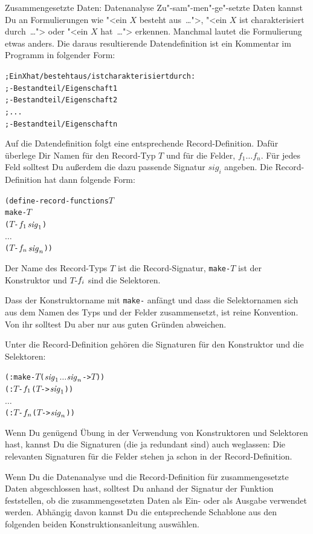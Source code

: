 \begin{konstruktionsanleitung}{Zusammengesetzte Daten: Datenanalyse}
  \label{ka:zusammengesetzt-datenanalyse}
Zu"-sam"-men"-ge"-setzte Daten kannst Du an Formulierungen wie "<ein $X$
besteht aus~\ldots">, "<ein $X$ ist charakterisiert durch~\ldots">
oder "<ein $X$ hat~\ldots"> erkennen.  Manchmal lautet die
Formulierung etwas anders.  Die daraus resultierende Datendefinition
ist ein Kommentar im Programm in folgender Form:
%
\begin{alltt}
; Ein X hat / besteht aus / ist charakterisiert durch:
; - Bestandteil / Eigenschaft 1
; - Bestandteil / Eigenschaft 2
; ...
; - Bestandteil / Eigenschaft n
\end{alltt}
%
Auf die Datendefinition folgt eine entsprechende Record-Definition.
Dafür überlege Dir Namen für den Record-Typ $T$ und für die
Felder, $f_1 \ldots f_n$.  Für jedes Feld solltest Du außerdem
die dazu passende Signatur $\mathit{sig}_{i}$ angeben.
Die Record-Definition hat dann folgende
Form:
%
\begin{alltt}
(define-record-functions \(T\)
  make-\(T\)
  (\(T\)-\(f\sb{1}\) \(\mathit{sig}\sb{1}\))
  \(\ldots\)
  (\(T\)-\(f\sb{n}\) \(\mathit{sig}\sb{n}\)))
\end{alltt}
%
Der Name des Record-Typs \(T\) ist die Record-Signatur,
\texttt{make-\(T\)} ist der Konstruktor und \(T\)-\(f\sb{i}\)
sind die Selektoren.

Dass der Konstruktorname mit \texttt{make-} anfängt und dass die
Selektornamen sich aus dem Namen des Typs und der Felder
zusammensetzt, ist reine Konvention.  Von ihr solltest Du aber nur aus
guten Gründen abweichen.

Unter die Record-Definition gehören die Signaturen für den Konstruktor
und die Selektoren:
%
\begin{alltt}
(: make-\(T\) (\(\mathit{sig}\sb{1}\) \(\ldots\) \(\mathit{sig}\sb{n}\) -> \(T\)))
(: \(T\)-\(f\sb{1}\) (\(T\) -> \(\mathit{sig}\sb{1}\)))
\(\ldots\)
(: \(T\)-\(f\sb{n}\) (\(T\) -> \(\mathit{sig}\sb{n}\)))
\end{alltt}
%
\end{konstruktionsanleitung}
%
Wenn Du genügend Übung in der Verwendung von Konstruktoren und
Selektoren hast, kannst Du die Signaturen (die ja redundant sind)
auch weglassen: Die relevanten Signaturen für die Felder stehen ja
schon in der Record-Definition.

Wenn Du die Datenanalyse und die Record-Definition für
zusammengesetzte Daten abgeschlossen hast, solltest Du anhand der
Signatur der Funktion feststellen, ob die zusammengesetzten Daten als
Ein- oder als Ausgabe verwendet werden.  Abhängig davon kannst Du die
entsprechende Schablone aus den folgenden beiden
Konstruktionsanleitung auswählen.

